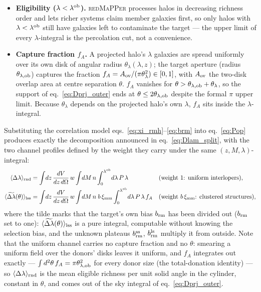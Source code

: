 \documentclass[a4paper, 11pt]{article}
\newcommand{\lob}{\lambda^{\rm ob}}
\newcommand{\ximm}{\xi_{\rm mm}}
\newcommand{\thob}{\theta_{\lambda,{\rm ob}}}
\newcommand{\brm}{b_{\rm rm}}
\newcommand{\brmss}{b_{\rm rm}^{\rm ss}}
\newcommand{\brmls}{b_{\rm rm}^{\rm ls}}
\newcommand{\Dlrnd}{\langle \Delta\lambda\rangle_{\rm rnd}}
\newcommand{\tDllss}[1]{\langle \widetilde{\Delta\lambda}(#1)\rangle_{\rm lss}}
\begin{document}
\begin{itemize}
\item \textbf{Eligibility ($\lambda<\lob$).}
      \textsc{redMaPPer} processes halos in decreasing richness
      order and lets richer systems claim member galaxies first,
      so only halos with $\lambda<\lob$ still have galaxies left
      to contaminate the target --- the upper limit of every
      $\lambda$-integral is the percolation cut, not a
      convenience.
\item \textbf{Capture fraction $f_A$.} A projected halo's
      $\lambda$ galaxies are spread uniformly over its own disk
      of angular radius $\theta_\lambda(\lambda,z)$; the target
      aperture (radius $\thob$) captures the fraction
      $f_A = A_{\rm ov}/(\pi\theta_\lambda^2)\in[0,1]$, with
      $A_{\rm ov}$ the two-disk overlap area at centre separation
      $\theta$. $f_A$ vanishes for
      $\theta>\thob+\theta_\lambda$, so the support of
      eq.~\eqref{eq:Dprj_outer} ends at $\theta\le 2\thob$
      despite the formal $\pi$ upper limit. Because
      $\theta_\lambda$ depends on the projected halo's own
      $\lambda$, $f_A$ sits inside the $\lambda$-integral.
\end{itemize}

Substituting the correlation model
eqs.~\eqref{eq:xi_rmh}--\eqref{eq:brm} into eq.~\eqref{eq:Pop}
produces exactly the decomposition announced in
eq.~\eqref{eq:Dlam_split}, with the two channel profiles defined
by the weight they carry under the same
$(z,M,\lambda)$-integral:
\begin{align}
\Dlrnd
&= \int\!dz\,\frac{dV}{dz\,d\Omega}\,w
\int\!dM\,n
\int_0^{\lob}\!d\lambda\,P\,\lambda
&&\text{(weight $1$: uniform interlopers)},
\label{eq:Dlam_rnd}\\
\tDllss{\theta}
&= \int\!dz\,\frac{dV}{dz\,d\Omega}\,w
\int\!dM\,n\; b\,\ximm
\int_0^{\lob}\!d\lambda\,P\,\lambda\,f_A
&&\text{(weight $b\,\ximm$: clustered structures)},
\label{eq:Dlam_lss}
\end{align}
where the tilde marks that the target's own bias $\brm$ has been
divided out ($\brm$ set to one): $\tDllss{\theta}$ is a pure
integral, computable without knowing the selection bias, and the
unknown plateaus $\brmss$, $\brmls$ multiply it from outside.
Note that the uniform channel carries no capture fraction and no
$\theta$: smearing a uniform field over the donors' disks leaves
it uniform, and $f_A$ integrates out exactly ---
$\int d^2\theta\, f_A = \pi\thob^2$ for every donor size (the
total-donation identity) --- so $\Dlrnd$ is the mean eligible
richness per unit solid angle in the cylinder, constant in
$\theta$, and comes out of the sky integral of
eq.~\eqref{eq:Dprj_outer}.
\end{document}
